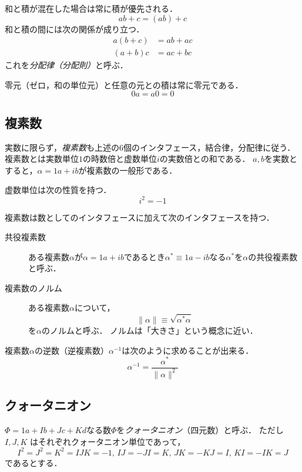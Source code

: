 \documentclass{jsbook}
\newcommand{\keyword}[1]{\emph{#1}}
\newcommand{\ii}{I}%
\newcommand{\jj}{J}%
\newcommand{\kk}{K}%
\newcommand{\im}{i}%
\newcommand{\norm}[1]{\|{#1}\|}
\begin{document}
和と積が混在した場合は常に積が優先される．
\begin{equation}
ab+c=(ab)+c
\end{equation}
和と積の間には次の関係が成り立つ．
\begin{align}
a(b+c)&=ab+ac\\
(a+b)c&=ac+bc
\end{align}
これを\keyword{分配律（分配則）}と呼ぶ．

零元（ゼロ，和の単位元）と任意の元との積は常に零元である．
\begin{equation}
0 a=a0 =0
\end{equation}

\subsection{複素数}

実数に限らず，\keyword{複素数}も上述の6個のインタフェース，結合律，分配律に従う．
複素数とは実数単位$1$の時数倍と虚数単位$\im$の実数倍との和である．
$a,b$を実数とすると，$\alpha=1 a+\im b$が複素数の一般形である．

虚数単位は次の性質を持つ．
\begin{equation}
\im^2=-1
\end{equation}

複素数は数としてのインタフェースに加えて次のインタフェースを持つ．
\begin{description}
\item[共役複素数] ある複素数$\alpha$が$\alpha=1 a+\im b$であるとき$\alpha^*\equiv1 a-\im b$なる$\alpha^*$を$\alpha$の共役複素数と呼ぶ．
\item[複素数のノルム] ある複素数$\alpha$について，
\begin{equation}
\norm{\alpha}\equiv\sqrt{\alpha^*\alpha}
\end{equation}
を$\alpha$のノルムと呼ぶ．
ノルムは「大きさ」という概念に近い．
\end{description}

複素数$\alpha$の逆数（逆複素数）$\alpha^{-1}$は次のように求めることが出来る．
\begin{equation}
\alpha^{-1}=\frac{\alpha^*}{\norm{\alpha}^2}
\end{equation}

\subsection{クォータニオン}

$\varPhi=1 a+\ii b+\jj c+\kk d$なる数$\varPhi$を\keyword{クォータニオン}（四元数）と呼ぶ．
ただし $\ii,\jj,\kk$ はそれぞれクォータニオン単位であって，
\begin{equation}
\ii^2=\jj^2=\kk^2=\ii\jj\kk=-1,\,
\ii\jj=-\jj\ii=\kk,\,
\jj\kk=-\kk\jj=\ii,\,
\kk\ii=-\ii\kk=\jj
\end{equation}
であるとする．
\end{document}
